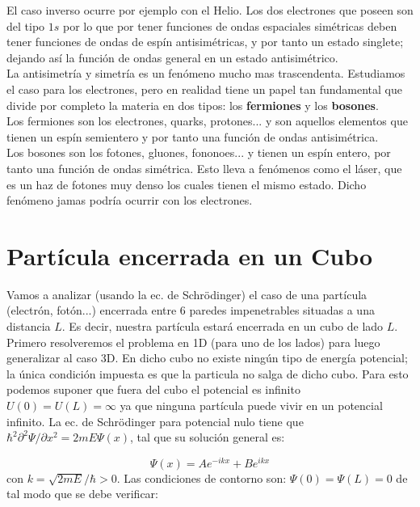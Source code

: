 \documentclass[12pt,a4paper]{article}
\numberwithin{equation}{section}
\numberwithin{figure}{section}
\begin{document}
El caso inverso ocurre por ejemplo con el Helio. Los dos electrones que poseen son del tipo $1s$ por lo que por tener funciones de ondas espaciales simétricas deben tener funciones de ondas de espín antisimétricas, y por tanto un estado singlete; dejando así la función de ondas general en un estado antisimétrico.\\

La antisimetría y simetría es un fenómeno mucho mas trascendenta. Estudiamos el caso para los electrones, pero en realidad tiene un papel tan fundamental que divide por completo la materia en dos tipos: los \textbf{fermiones} y los \textbf{bosones}. \\

Los fermiones son los electrones, quarks, protones... y son aquellos elementos que tienen un espín semientero y por tanto una función de ondas antisimétrica. \\

Los bosones son los fotones, gluones, fononoes...  y tienen un espín entero, por tanto una función de ondas simétrica. Esto lleva a fenómenos como el láser, que es un haz de fotones muy denso los cuales tienen el mismo estado. Dicho fenómeno jamas podría ocurrir con los electrones. 


\section{Partícula encerrada en un Cubo \label{Sec:24}}

Vamos a analizar (usando la ec. de Schrödinger) el caso de una partícula (electrón, fotón...) encerrada entre 6 paredes impenetrables situadas a una distancia $L$. Es decir, nuestra partícula estará encerrada en un cubo de lado $L$. Primero resolveremos el problema en 1D (para uno de los lados) para luego generalizar al caso 3D. En dicho cubo no existe ningún tipo de energía potencial; la única condición impuesta es que la particula no salga de dicho cubo. Para esto podemos suponer que fuera del cubo el potencial es infinito $U(0)=U(L) = \infty$ ya que ninguna partícula puede vivir en un potencial infinito. La ec. de Schrödinger para potencial nulo tiene que $\hbar^2 \partial^2 \Psi / \partial x^2 = 2 m E \Psi (x)$, tal que su solución general es: 

\begin{equation}
\Psi (x) = A e^{-ikx} + B e^{ikx}
\end{equation}
con $k = \sqrt{2mE}/\hbar > 0 $. Las condiciones de contorno son: $\Psi(0) = \Psi(L) = 0$ de tal modo que se debe verificar:
\end{document}
